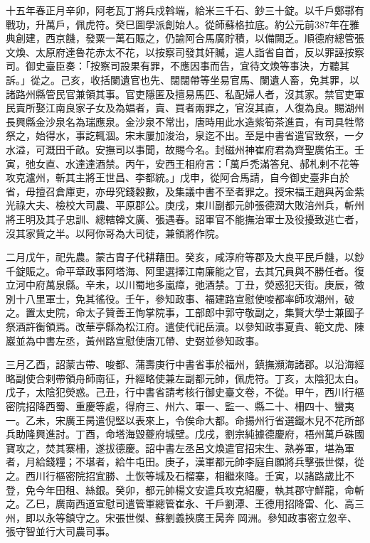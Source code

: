 
\begin{pinyinscope}

 十五年春正月辛卯，阿老瓦丁將兵戍斡端，給米三千石、鈔三十錠。以千戶鄭鄩有戰功，升萬戶，佩虎符。癸巳圖學派創始人。從師蘇格拉底。約公元前387年在雅典創建，西京饑，發粟一萬石賑之，仍諭阿合馬廣貯積，以備闕乏。順德府總管張文煥、太原府達魯花赤太不花，以按察司發其奸贓，遣人詣省自首，反以罪誣按察司。御史臺臣奏：「按察司設果有罪，不應因事而告，宜待文煥等事決，方聽其訴。」從之。己亥，收括闌遺官也先、闊闊帶等坐易官馬、闌遺人畜，免其罪，以諸路州縣管民官兼領其事。官吏隱匿及擅易馬匹、私配婦人者，沒其家。禁官吏軍民賣所娶江南良家子女及為娼者，賣、買者兩罪之，官沒其直，人復為良。賜湖州長興縣金沙泉名為瑞應泉。金沙泉不常出，唐時用此水造紫筍茶進貢，有司具牲幣祭之，始得水，事訖輒涸。宋末屢加浚治，泉迄不出。至是中書省遣官致祭，一夕水溢，可溉田千畝。安撫司以事聞，故賜今名。封磁州神崔府君為齊聖廣佑王。壬寅，弛女直、水達達酒禁。丙午，安西王相府言：「萬戶禿滿答兒、郝札剌不花等攻克瀘州，斬其主將王世昌、李都統。」戊申，從阿合馬請，自今御史臺非白於省，毋擅召倉庫吏，亦毋究錢穀數，及集議中書不至者罪之。授宋福王趙與芮金紫光祿大夫、檢校大司農、平原郡公。庚戌，東川副都元帥張德潤大敗涪州兵，斬州將王明及其子忠訓、總轄韓文廣、張遇春。詔軍官不能撫治軍士及役擾致逃亡者，沒其家貲之半。以阿你哥為大司徒，兼領將作院。



 二月戊午，祀先農。蒙古胄子代耕藉田。癸亥，咸淳府等郡及大良平民戶饑，以鈔千錠賑之。命平章政事阿塔海、阿里選擇江南廉能之官，去其冗員與不勝任者。復立河中府萬泉縣。辛未，以川蜀地多嵐瘴，弛酒禁。丁丑，熒惑犯天街。庚辰，徵別十八里軍士，免其徭役。壬午，參知政事、福建路宣慰使唆都率師攻潮州，破之。置太史院，命太子贊善王恂掌院事，工部郎中郭守敬副之，集賢大學士兼國子祭酒許衡領焉。改華亭縣為松江府。遣使代祀岳瀆。以參知政事夏貴、範文虎、陳巖並為中書左丞，黃州路宣慰使唐兀帶、史弼並參知政事。



 三月乙酉，詔蒙古帶、唆都、蒲壽庚行中書省事於福州，鎮撫瀕海諸郡。以沿海經略副使合剌帶領舟師南征，升經略使兼左副都元帥，佩虎符。丁亥，太陰犯太白。戊子，太陰犯熒惑。己丑，行中書省請考核行御史臺文卷，不從。甲午，西川行樞密院招降西蜀、重慶等處，得府三、州六、軍一、監一、縣二十、柵四十、蠻夷一。乙未，宋廣王昺遣倪堅以表來上，令俟命大都。命揚州行省選鐵木兒不花所部兵助隆興進討。丁酉，命塔海毀夔府城壁。戊戌，劉宗純據德慶府，梧州萬戶硃國寶攻之，焚其寨柵，遂拔德慶。詔中書左丞呂文煥遣官招宋生、熟券軍，堪為軍者，月給錢糧；不堪者，給牛屯田。庚子，漢軍都元帥李庭自願將兵擊張世傑，從之。西川行樞密院招宜勝、土恢等城及石榴寨，相繼來降。壬寅，以諸路歲比不登，免今年田租、絲銀。癸卯，都元帥楊文安遣兵攻克紹慶，執其郡守鮮龍，命斬之。乙巳，廣南西道宣慰司遣管軍總管崔永、千戶劉潭、王德用招降雷、化、高三州，即以永等鎮守之。宋張世傑、蘇劉義挾廣王昺奔岡洲。參知政事密立忽辛、張守智並行大司農司事。




\end{pinyinscope}
